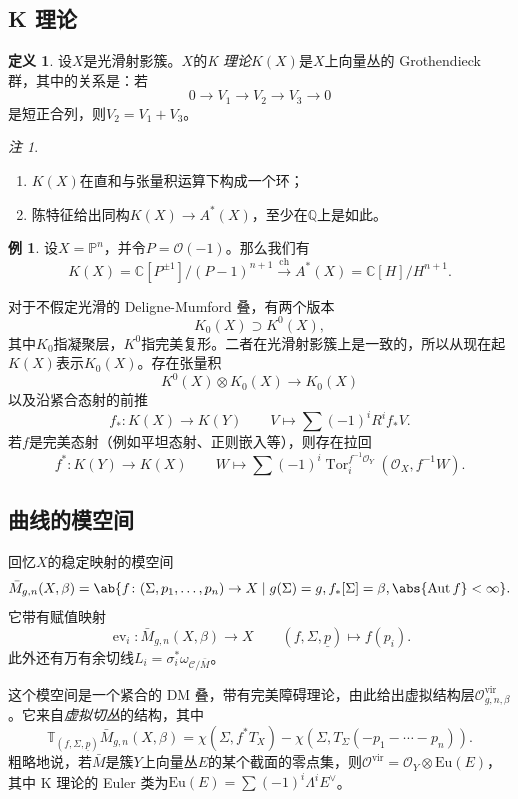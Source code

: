 \documentclass{amsart}
\theoremstyle{definition}
\newtheorem{defn}[thm]{定义}
\newtheorem{exm}[thm]{例}
\theoremstyle{remark}
\newtheorem{rmk}[thm]{注}
\theoremstyle{plain}
\theoremstyle{definition}
\theoremstyle{remark}
\newcommand{\C}{\mathbb{C}}
\newcommand{\Q}{\mathbb{Q}}
\renewcommand{\P}{\mathbb{P}}
\newcommand{\mc}[1]{\mathcal{#1}}
\newcommand{\mr}[1]{\mathrm{#1}}
\newcommand{\on}[1]{\operatorname{#1}}
\newcommand{\ul}[1]{\underline{#1}}
\newcommand{\1}{\mathbf{1}}
\newcommand{\2}{\mathbf{2}}
\newcommand{\3}{\mathbf{3}}
\newcommand{\vir}{\mr{vir}}
\DeclareMathOperator{\Aut}{Aut}
\DeclareMathOperator{\ev}{ev}
\begin{document}
\subsection{K 理论}%
\label{sub:K-theory}

\begin{defn}
    设\(X\)是光滑射影簇。\(X\)的\textit{K 理论}\(K(X)\)是\(X\)上向量丛的 Grothendieck 群，其中的关系是：若
    \[ 0 \to V_1 \to V_2 \to V_3 \to 0 \]
    是短正合列，则\(V_2 = V_1 + V_3\)。
\end{defn}

\begin{rmk}\leavevmode
    \begin{enumerate}
        \item \(K(X)\)在直和与张量积运算下构成一个环；
        \item 陈特征给出同构\(K(X) \to A^*(X)\)，至少在\(\Q\)上是如此。
    \end{enumerate}
\end{rmk}

\begin{exm}
    设\(X = \P^n\)，并令\(P = \mc{O}(-1)\)。那么我们有
    \[ K(X) = \C[P^{\pm 1}]/(P-1)^{n+1} \xrightarrow{\on{ch}} A^*(X) = \C[H]/H^{n+1}. \]
\end{exm}

对于不假定光滑的 Deligne-Mumford 叠，有两个版本
\[ K_0(X) \supset K^0(X), \]
其中\(K_0\)指凝聚层，\(K^0\)指完美复形。二者在光滑射影簇上是一致的，所以从现在起\(K(X)\)表示\(K_0(X)\)。存在张量积
\[ K^0(X) \otimes K_0(X) \to K_0(X) \]
以及沿紧合态射的前推
\[ f_* \colon K(X) \to K(Y) \qquad V \mapsto \sum (-1)^i R^i f_* V. \]
若\(f\)是完美态射（例如平坦态射、正则嵌入等），则存在拉回
\[ f^* \colon K(Y) \to K(X) \qquad W \mapsto \sum (-1)^i \on{Tor}_i^{f^{-1} \mc{O}_Y} (\mc{O}_X, f^{-1} W). \]

\subsection{曲线的模空间}%
\label{sub:Moduli of curves}

回忆\(X\)的稳定映射的模空间
\[ \bar{M}_{g,n}(X, \beta) = \ab\{ f \colon (\Sigma, p_1, \ldots, p_n) \to X \mid g(\Sigma) = g, f_*[\Sigma] = \beta, \abs{\Aut f} < \infty \}. \]
它带有赋值映射
\[ \ev_i \colon \bar{M}_{g,n}(X, \beta) \to X \qquad (f, \Sigma, \ul{p}) \mapsto f(p_i). \]
此外还有万有余切线\(L_i = \sigma_i^* \omega_{ \mc{C}/\bar{M} }\)。

这个模空间是一个紧合的 DM 叠，带有完美障碍理论，由此给出虚拟结构层\(\mc{O}^{\vir}_{g,n,\beta}\)。它来自\textit{虚拟切丛}的结构，其中
\[ \mathbb{T}_{(f, \Sigma, \ul{p})} \bar{M}_{g,n}(X, \beta) = \chi(\Sigma, f^* T_X) - \chi(\Sigma, T_{\Sigma}(-p_1 - \cdots - p_n)). \]
粗略地说，若\(\bar{M}\)是簇\(Y\)上向量丛\(E\)的某个截面的零点集，则\(\mc{O}^{\vir} = \mc{O}_Y \otimes \mr{Eu}(E)\)，其中 K 理论的 Euler 类为\(\mr{Eu}(E) = \sum (-1)^i \Lambda^i E^{\vee}\)。
\end{document}
